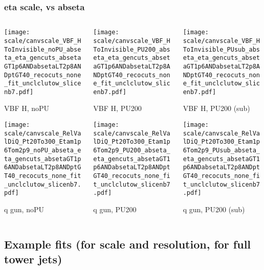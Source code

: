 \documentclass[8pt]{beamer}
\begin{document}
  \begin{frame}
  \frametitle{eta scale, vs abseta}
  
  \begin{columns}
   \begin{column}{0.35\textwidth}
     \texttt{[image: scale/canvscale\_VBF\_HToInvisible\_noPU\_abseta\_eta\_gencuts\_absetaGT1p6ANDabsetaLT2p8ANDptGT40\_recocuts\_none\_fit\_unclclutow\_slicenb7.pdf]}
     
     VBF H, noPU
    
     \texttt{[image: scale/canvscale\_RelValDiQ\_Pt20To300\_Etam1p6Tom2p9\_noPU\_abseta\_eta\_gencuts\_absetaGT1p6ANDabsetaLT2p8ANDptGT40\_recocuts\_none\_fit\_unclclutow\_slicenb7.pdf]}
     
     q gun, noPU
   \end{column}
   \begin{column}{0.35\textwidth}
     \texttt{[image: scale/canvscale\_VBF\_HToInvisible\_PU200\_abseta\_eta\_gencuts\_absetaGT1p6ANDabsetaLT2p8ANDptGT40\_recocuts\_none\_fit\_unclclutow\_slicenb7.pdf]}
     
     VBF H, PU200
    
     \texttt{[image: scale/canvscale\_RelValDiQ\_Pt20To300\_Etam1p6Tom2p9\_PU200\_abseta\_eta\_gencuts\_absetaGT1p6ANDabsetaLT2p8ANDptGT40\_recocuts\_none\_fit\_unclclutow\_slicenb7.pdf]}
     
     q gun, PU200
   \end{column}
   \begin{column}{0.35\textwidth}
     \texttt{[image: scale/canvscale\_VBF\_HToInvisible\_PUsub\_abseta\_eta\_gencuts\_absetaGT1p6ANDabsetaLT2p8ANDptGT40\_recocuts\_none\_fit\_unclclutow\_slicenb7.pdf]}
     
     VBF H, PU200 (sub)
    
     \texttt{[image: scale/canvscale\_RelValDiQ\_Pt20To300\_Etam1p6Tom2p9\_PUsub\_abseta\_eta\_gencuts\_absetaGT1p6ANDabsetaLT2p8ANDptGT40\_recocuts\_none\_fit\_unclclutow\_slicenb7.pdf]}
     
     q gun, PU200 (sub)
   \end{column}
  \end{columns}
 \end{frame}
 
 \subsection{Example fits (for scale and resolution, for full tower jets)}
\end{document}
